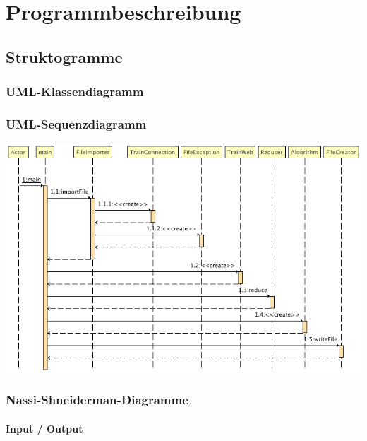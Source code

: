 \chapter{Programmbeschreibung}\label{pro:ch:programmbeschreibung}

\section{Struktogramme}\label{pro:sec:pap}

\subsection{UML-Klassendiagramm}\label{pro:subsec:uml-klassendiagramm}

\subsection{UML-Sequenzdiagramm}\label{pro:subsec:uml-sequenzdiagramm}
\begin{center}
    \includegraphics[width=\linewidth]{images/Struktogramme/Sequenzdiagramm.png}
    \label{pro:subsecpar:uml-sequenzdiagramm}
\end{center}

\subsection{Nassi-Shneiderman-Diagramme}\label{pro:subsec:nassi-shneiderman-diagramme}
\subsubsection{Input / Output}\label{pro:subsubsec:io}
